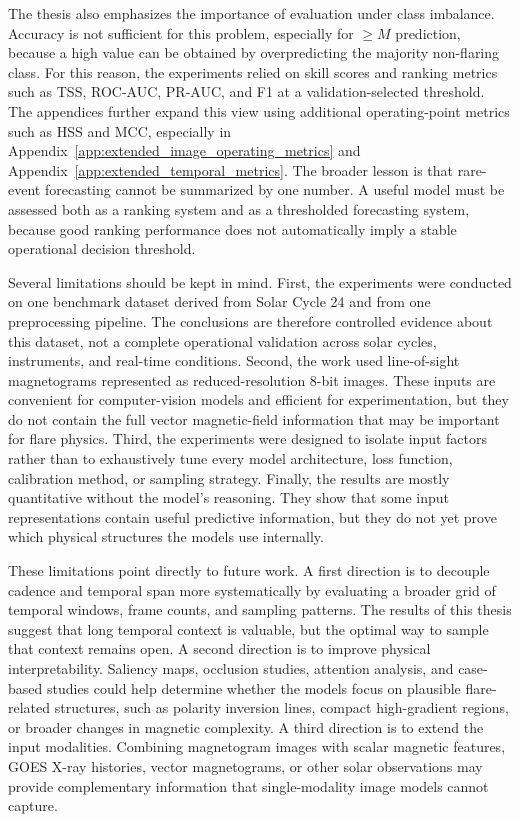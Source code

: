 The thesis also emphasizes the importance of evaluation under class imbalance. Accuracy is not sufficient for this problem, especially for $\geq M$ prediction, because a high value can be obtained by overpredicting the majority non-flaring class. For this reason, the experiments relied on skill scores and ranking metrics such as TSS, ROC-AUC, PR-AUC, and F1 at a validation-selected threshold. The appendices further expand this view using additional operating-point metrics such as HSS and MCC, especially in Appendix~\ref{app:extended_image_operating_metrics} and Appendix~\ref{app:extended_temporal_metrics}. The broader lesson is that rare-event forecasting cannot be summarized by one number. A useful model must be assessed both as a ranking system and as a thresholded forecasting system, because good ranking performance does not automatically imply a stable operational decision threshold.

Several limitations should be kept in mind. First, the experiments were conducted on one benchmark dataset derived from Solar Cycle 24 and from one preprocessing pipeline. The conclusions are therefore controlled evidence about this dataset, not a complete operational validation across solar cycles, instruments, and real-time conditions. Second, the work used line-of-sight magnetograms represented as reduced-resolution 8-bit images. These inputs are convenient for computer-vision models and efficient for experimentation, but they do not contain the full vector magnetic-field information that may be important for flare physics. Third, the experiments were designed to isolate input factors rather than to exhaustively tune every model architecture, loss function, calibration method, or sampling strategy. Finally, the results are mostly quantitative without the model's reasoning. They show that some input representations contain useful predictive information, but they do not yet prove which physical structures the models use internally.

These limitations point directly to future work. A first direction is to decouple cadence and temporal span more systematically by evaluating a broader grid of temporal windows, frame counts, and sampling patterns. The results of this thesis suggest that long temporal context is valuable, but the optimal way to sample that context remains open. A second direction is to improve physical interpretability. Saliency maps, occlusion studies, attention analysis, and case-based studies could help determine whether the models focus on plausible flare-related structures, such as polarity inversion lines, compact high-gradient regions, or broader changes in magnetic complexity. A third direction is to extend the input modalities. Combining magnetogram images with scalar magnetic features, GOES X-ray histories, vector magnetograms, or other solar observations may provide complementary information that single-modality image models cannot capture.


